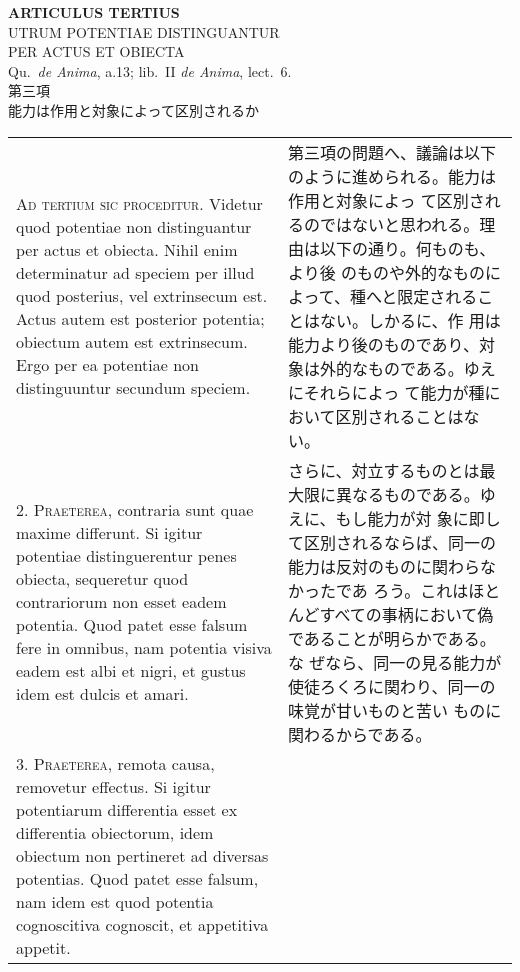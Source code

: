 \documentclass[paper=a4paper,fontsize=10pt,jafontsize=9pt,titlepage]{jlreq}
\begin{document}
\begin{center}
{\Large {\bfseries ARTICULUS TERTIUS}}\\
{\large UTRUM POTENTIAE DISTINGUANTUR\\PER ACTUS ET OBIECTA}\\
{\footnotesize Qu.~{\itshape de Anima}, a.13; lib.~II {\itshape de Anima}, lect.~6.}\\
{\Large 第三項\\能力は作用と対象によって区別されるか}
\end{center}

\begin{longtable}{p{21em}p{21em}}
 {\scshape Ad tertium sic proceditur}. Videtur quod potentiae non
 distinguantur per actus et obiecta. Nihil enim determinatur ad
 speciem per illud quod posterius, vel extrinsecum est. Actus autem
 est posterior potentia; obiectum autem est extrinsecum. Ergo per ea
 potentiae non distinguuntur secundum speciem.
 
&

 第三項の問題へ、議論は以下のように進められる。能力は作用と対象によっ
 て区別されるのではないと思われる。理由は以下の通り。何ものも、より後
 のものや外的なものによって、種へと限定されることはない。しかるに、作
 用は能力より後のものであり、対象は外的なものである。ゆえにそれらによっ
 て能力が種において区別されることはない。


\\



2. {\scshape Praeterea}, contraria sunt quae maxime differunt. Si
igitur potentiae distinguerentur penes obiecta, sequeretur quod
contrariorum non esset eadem potentia. Quod patet esse falsum fere in
omnibus, nam potentia visiva eadem est albi et nigri, et gustus idem
est dulcis et amari.

 
&

さらに、対立するものとは最大限に異なるものである。ゆえに、もし能力が対
象に即して区別されるならば、同一の能力は反対のものに関わらなかったであ
ろう。これはほとんどすべての事柄において偽であることが明らかである。な
ぜなら、同一の見る能力が使徒ろくろに関わり、同一の味覚が甘いものと苦い
ものに関わるからである。

\\



3. {\scshape Praeterea}, remota causa, removetur effectus. Si igitur
potentiarum differentia esset ex differentia obiectorum, idem obiectum
non pertineret ad diversas potentias. Quod patet esse falsum, nam idem
est quod potentia cognoscitiva cognoscit, et appetitiva appetit.
 

\end{longtable}
\end{document}
